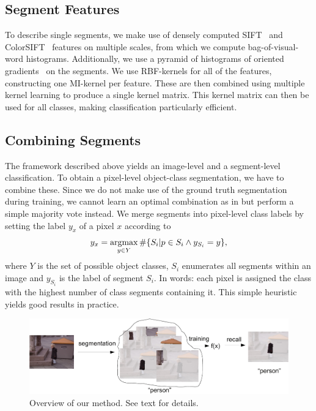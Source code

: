 \subsection{Segment Features}

To describe single segments, we make use of densely computed
SIFT~\citep{lowe2004distinctive} and ColorSIFT~\citep{van2009evaluating}
features on multiple scales, from which we compute bag-of-visual-word histograms. Additionally, we
use a pyramid of histograms of oriented gradients~\citep{dalal2005histograms} on the
segments.  We use RBF-kernels for all of the features, constructing one
MI-kernel per feature. These are then combined using multiple kernel learning
to produce a single kernel matrix. This kernel matrix can then be used for all
classes, making classification particularly efficient.

\subsection{Combining Segments}

The framework described above yields an image-level and a segment-level
classification.  To obtain a pixel-level object-class segmentation, we have to
combine these.  Since we do not make use of the ground truth segmentation
during training, we cannot learn an optimal combination as in
\citet{li2010object} but perform a simple majority vote instead.  We merge
segments into pixel-level class labels by setting the label $y_x$ of a pixel
$x$ according to
\begin{equation}
    y_x = \operatorname*{argmax}_{y \in Y} \#\{S_i | p \in S_i \land y_{S_i}=y \},
\end{equation}
where $Y$ is the set of possible object classes, $S_i$ enumerates all segments within an
image and $y_{S_i}$ is the label of segment $S_i$. In words: each pixel is
assigned the class with the highest number of class segments containing it.
This simple heuristic yields good results in practice.

\begin{figure}[tbp]
	\begin{center}
        \includegraphics[width=\linewidth]{images/scheme-crop.pdf}
	\end{center}
        \caption{Overview of our method. See text for details.}
\end{figure}

